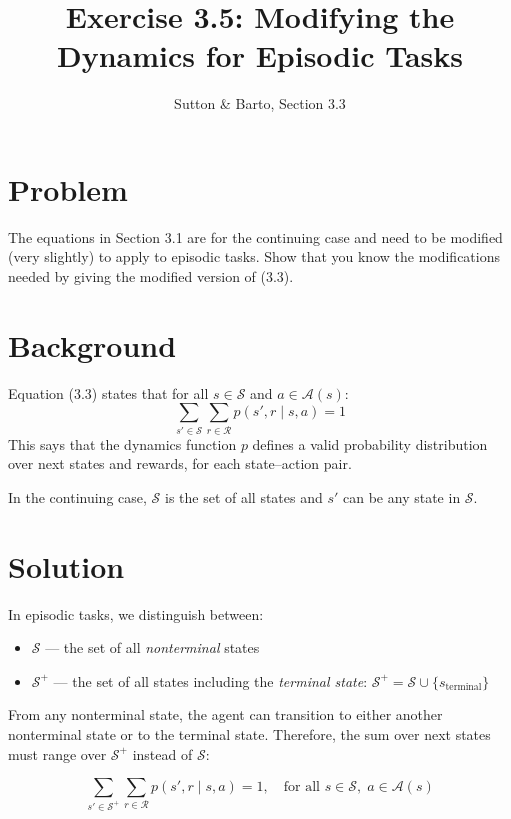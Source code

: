 \documentclass[11pt]{article}
\title{Exercise 3.5: Modifying the Dynamics for Episodic Tasks}
\author{Sutton \& Barto, Section 3.3}
\date{}
\begin{document}
\maketitle

\section*{Problem}

The equations in Section 3.1 are for the continuing case and need to be
modified (very slightly) to apply to episodic tasks. Show that you know
the modifications needed by giving the modified version of (3.3).

\section*{Background}

Equation (3.3) states that for all $s \in \mathcal{S}$ and $a \in \mathcal{A}(s)$:
\begin{equation}
    \sum_{s' \in \mathcal{S}} \sum_{r \in \mathcal{R}} p(s', r \mid s, a) = 1
    \tag{3.3}
\end{equation}
This says that the dynamics function $p$ defines a valid probability
distribution over next states and rewards, for each state--action pair.

In the continuing case, $\mathcal{S}$ is the set of all states and
$s'$ can be any state in $\mathcal{S}$.

\section*{Solution}

In episodic tasks, we distinguish between:
\begin{itemize}
    \item $\mathcal{S}$ --- the set of all \emph{nonterminal} states
    \item $\mathcal{S}^+$ --- the set of all states including the
          \emph{terminal state}: $\mathcal{S}^+ = \mathcal{S} \cup \{s_{\text{terminal}}\}$
\end{itemize}

From any nonterminal state, the agent can transition to either another
nonterminal state or to the terminal state. Therefore, the sum over
next states must range over $\mathcal{S}^+$ instead of $\mathcal{S}$:

\[
    \boxed{\sum_{s' \in \mathcal{S}^+} \sum_{r \in \mathcal{R}}
    p(s', r \mid s, a) = 1, \quad
    \text{for all } s \in \mathcal{S}, \; a \in \mathcal{A}(s)}
\]
\end{document}
